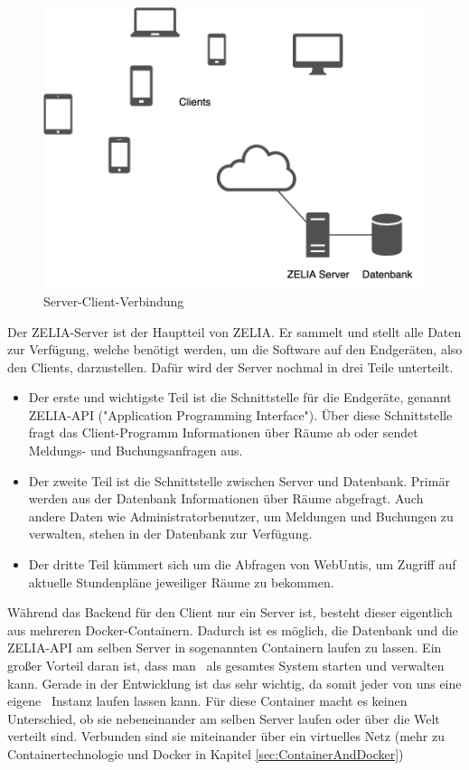 \begin{figure}[H]
    \centering
    \includegraphics[width=120mm]{./media/Intro/client_server_arch.png}
    \caption{Server-Client-Verbindung}
\end{figure}


Der ZELIA-Server ist der Hauptteil von ZELIA. Er sammelt und stellt alle Daten zur Verfügung, welche benötigt werden, um die Software auf den Endgeräten, also den Clients, darzustellen. Dafür wird der Server nochmal in drei Teile unterteilt.

\begin{itemize}
    \item Der erste und wichtigste Teil ist die Schnittstelle für die Endgeräte, genannt ZELIA-API ("Application Programming Interface"). Über diese Schnittstelle fragt das Client-Programm Informationen über Räume ab oder sendet Meldungs- und Buchungsanfragen aus.
    \item Der zweite Teil ist die Schnittstelle zwischen Server und Datenbank. Primär werden aus der Datenbank Informationen über Räume abgefragt. Auch andere Daten wie Administratorbenutzer, um Meldungen und Buchungen zu verwalten, stehen in der Datenbank zur Verfügung. 
    \item Der dritte Teil kümmert sich um die Abfragen von WebUntis, um Zugriff auf aktuelle Stundenpläne jeweiliger Räume zu bekommen.
\end{itemize}

Während das Backend für den Client nur ein Server ist, besteht dieser eigentlich aus mehreren Docker-Containern. Dadurch ist es möglich, die Datenbank und die ZELIA-API am selben Server in sogenannten Containern laufen zu lassen. Ein großer Vorteil daran ist, dass man \ZELIA\ als gesamtes System starten und verwalten kann. Gerade in der Entwicklung ist das sehr wichtig, da somit jeder von uns eine eigene \ZELIA\ Instanz laufen lassen kann. Für diese Container macht es keinen Unterschied, ob sie nebeneinander am selben Server laufen oder über die Welt verteilt sind. Verbunden sind sie miteinander über ein virtuelles Netz (mehr zu Containertechnologie und Docker in Kapitel \ref{sec:ContainerAndDocker})

